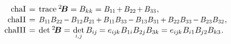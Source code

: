 \vspace{-0.25em}
\begin{equation}\label{invariants:2}
\begin{array}{r@{\hspace{.4em}}c@{\hspace{.4em}}l}
\firstcharacteristicinvariant
& = &
\trace{^2\!\bm{B}} = B_{kk}
= \scalebox{.92}[.96]{$ B_{1\hspace{-0.1ex}1}
\hspace{-0.2ex} + \hspace{-0.1ex}
B_{22}
\hspace{-0.2ex} + \hspace{-0.1ex}
B_{33} $}
\hspace{.1ex} ,
\\[.1em]
%
\secondcharacteristicinvariant
& = &
\scalebox{.92}[.96]{$ B_{1\hspace{-0.1ex}1}B_{22}
\hspace{-0.2ex} - \hspace{-0.1ex}
B_{12}B_{21}
\hspace{-0.2ex} + \hspace{-0.1ex}
B_{1\hspace{-0.1ex}1}B_{33}
\hspace{-0.2ex} - \hspace{-0.1ex}
B_{13}B_{31}
\hspace{-0.2ex} + \hspace{-0.1ex}
B_{22}B_{33}
\hspace{-0.2ex} - \hspace{-0.1ex}
B_{23}B_{32} $}
\hspace{.1ex} ,
\\[.1em]
%
\thirdcharacteristicinvariant
& = &
\operatorname{det} \hspace{.1ex} {^2\!\bm{B}}
= \hspace{.15ex}
\underset{\raisebox{.15em}{%
   \scalebox{.7}{ $i$,$\hspace{.15ex}j$ }%
}}%
{\operatorname{det}} \, B_{i\hspace{-0.1ex}j} \hspace{-0.15ex}
= e_{i\hspace{-0.1ex}j\hspace{-0.1ex}k} \hspace{.1ex} B_{1i} B_{2j} B_{3k} \hspace{-0.1ex}
= e_{i\hspace{-0.1ex}j\hspace{-0.1ex}k} \hspace{.1ex} B_{i1} B_{\hspace{-0.1ex}j2} B_{k3}
\hspace{.1ex} .
\end{array}\end{equation}

